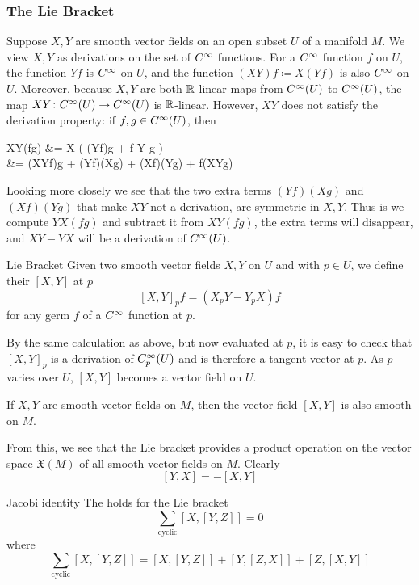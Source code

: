 \subsubsection{The Lie Bracket}

Suppose \(X,Y\) are smooth vector fields on an open subset \(U\) of a manifold \(M\).
We view \(X,Y\) as derivations on the set of \(C^\infty\) functions.
For a \(C^\infty\) function \(f\) on \(U\), the function \(Yf\) is \(C^\infty\) on \(U\), and the function \((XY)f \coloneqq X(Yf)\) is also \(C^\infty\) on \(U\).
Moreover, because \(X,Y\) are both \(\mathbb{R}\)-linear maps from \(C^\infty(U)\) to \(C^\infty(U)\), the map \(XY \colon C^\infty(U) \rightarrow C^\infty(U)\) is \(\mathbb{R}\)-linear.
However, \(XY\) does not satisfy the derivation property: if \(f,g \in C^\infty(U)\), then 
\begin{splitenv}
    XY(fg) &= X \left( (Yf)g + f Y g \right)  \\ 
    &= (XYf)g + (Yf)(Xg) + (Xf)(Yg) + f(XYg)
\end{splitenv}
Looking more closely we see that the two extra terms \((Yf)(Xg)\) and \((Xf)(Yg)\) that make \(XY\) not a derivation, are symmetric in \(X,Y\).
Thus is we compute \(YX(fg)\) and subtract it from \(XY(fg)\), the extra terms will disappear, and \(XY-YX\) will be a derivation of \(C^\infty(U)\).
\begin{definition}{Lie Bracket}{}
    Given two smooth vector fields \(X,Y\) on \(U\) and with \(p \in U\), we define their  \(\left[X,Y\right]\) at \(p\)
    \begin{equation}
        \left[X,Y\right]_p f = (X_p Y - Y_p X)f
    \end{equation}
    for any germ \(f\) of a \(C^\infty\) function at \(p\).
\end{definition}
By the same calculation as above, but now evaluated at \(p\), it is easy to check that \([X,Y]_p\) is a derivation of \(C^\infty_p (U)\) and is therefore a tangent vector at \(p\).
As \(p\) varies over \(U\), \([X,Y]\) becomes a vector field on \(U\).
\begin{proposition}{}
    If \(X,Y\) are smooth vector fields on \(M\), then the vector field \([X,Y]\) is also smooth on \(M\).
\end{proposition}
From this, we see that the Lie bracket provides a product operation on the vector space \(\mathfrak{X}(M)\) of all smooth vector fields on \(M\).
Clearly
\[
    [Y,X] = -[X,Y]    
\]
\begin{example}{Jacobi identity}{}
    The  holds for the Lie bracket 
    \[\sum_{\text{cyclic}} \left[ X, [Y,Z] \right] = 0\]
    where 
    \[
        \sum_{\text{cyclic}} \left[ X, [Y,Z] \right] = [X, [Y,Z]] + [Y, [Z,X]] + [Z,[X,Y]]
    \]
\end{example}
